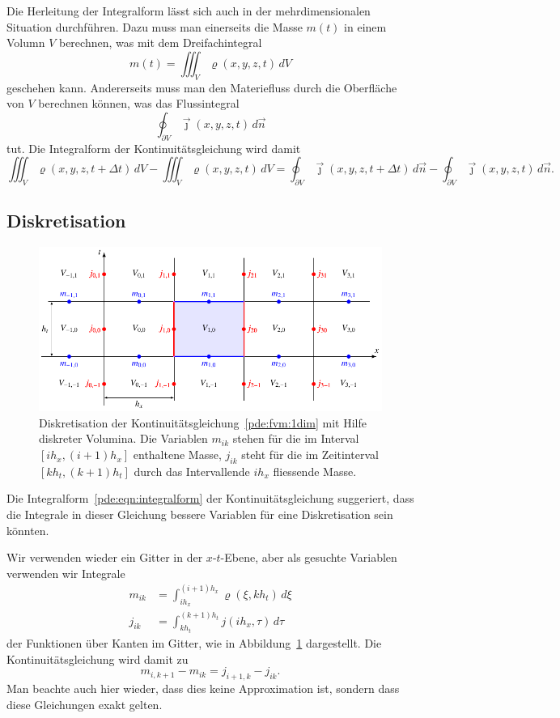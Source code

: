 Die Herleitung der Integralform lässt sich auch in der mehrdimensionalen
Situation durchführen.
Dazu muss man einerseits die Masse $m(t)$ in einem Volumn $V$ berechnen,
was mit dem Dreifachintegral
\[
m(t)
=
\iiint_V \varrho(x,y,z,t) \,dV
\]
geschehen kann.
Andererseits muss man den Materiefluss durch die Oberfläche von $V$
berechnen können, was das Flussintegral
\[
\oint_{\partial V} \vec{\jmath}(x,y,z,t) \,d\vec{n}
\]
tut.
Die Integralform der Kontinuitätsgleichung wird damit
\[
\iiint_V \varrho(x,y,z,t+\Delta t) \,dV
-
\iiint_V \varrho(x,y,z,t) \,dV
=
\oint_{\partial V} \vec{\jmath}(x,y,z,t+\Delta t)\,d\vec{n}
-
\oint_{\partial V} \vec{\jmath}(x,y,z,t)\,d\vec{n}.
\]


\subsection{Diskretisation}
\begin{figure}
\centering
\includegraphics{chapters/70-pde/images/kont.pdf}
\caption{Diskretisation der Kontinuitätsgleichung~\eqref{pde:fvm:1dim}
mit Hilfe diskreter Volumina. 
Die Variablen $m_{ik}$ stehen für die im Interval $[ih_x,(i+1)h_x]$
enthaltene Masse, $j_{ik}$ steht für die im Zeitinterval $[kh_t,(k+1)h_t]$
durch das Intervallende $ih_x$ fliessende Masse.
\label{buch:pde:fvdisk}}
\end{figure}
Die Integralform~\eqref{pde:eqn:integralform}
der Kontinuitätsgleichung suggeriert, dass die Integrale
in dieser Gleichung bessere Variablen für eine Diskretisation
sein könnten.

Wir verwenden wieder ein Gitter in der $x$-$t$-Ebene, aber 
als gesuchte Variablen verwenden wir Integrale
\begin{align*}
m_{ik}
&=
\int_{ih_x}^{(i+1)h_x} \varrho(\xi,kh_t)\,d\xi
\\
j_{ik}
&=
\int_{kh_t}^{(k+1)h_t} j(ih_x,\tau) \,d\tau
\end{align*}
der Funktionen über Kanten im Gitter, wie in Abbildung~\ref{buch:pde:fvdisk}
dargestellt.
Die Kontinuitätsgleichung wird damit zu
\begin{equation}
m_{i,k+1}-m_{ik}
=
j_{i+1,k}-j_{ik}.
\label{pde:fvm:1dim}
\end{equation}
Man beachte auch hier wieder, dass dies keine Approximation ist, sondern
dass diese Gleichungen exakt gelten.

